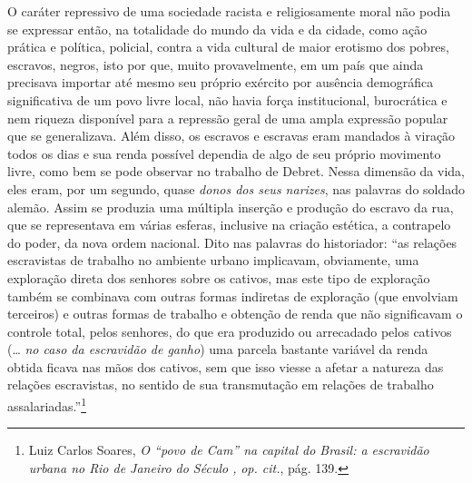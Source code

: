 O caráter repressivo de uma sociedade racista e religiosamente moral não
podia se expressar então, na totalidade do mundo da vida e da cidade,
como ação prática e política, policial, contra a vida cultural de maior
erotismo dos pobres, escravos, negros, isto por que, muito
provavelmente, em um país que ainda precisava importar até mesmo seu
próprio exército por ausência demográfica significativa de um povo livre
local, não havia força institucional, burocrática e nem riqueza
disponível para a repressão geral de uma ampla expressão popular que se
generalizava. Além disso, os escravos e escravas eram mandados à viração
todos os dias e sua renda possível dependia de algo de seu próprio
movimento livre, como bem se pode observar no trabalho de Debret. Nessa
dimensão da vida, eles eram, por um segundo, quase \emph{donos dos seus
narizes}, nas palavras do soldado alemão. Assim se produzia uma múltipla
inserção e produção do escravo da rua, que se representava em várias
esferas, inclusive na criação estética, a contrapelo do poder, da nova
ordem nacional. Dito nas palavras do historiador: ``as relações
escravistas de trabalho no ambiente urbano implicavam, obviamente, uma
exploração direta dos senhores sobre os cativos, mas este tipo de
exploração também se combinava com outras formas indiretas de exploração
(que envolviam terceiros) e outras formas de trabalho e obtenção de
renda que não significavam o controle total, pelos senhores, do que era
produzido ou arrecadado pelos cativos (\ldots{} \emph{no caso da escravidão
de ganho}) uma parcela bastante variável da renda obtida ficava nas mãos
dos cativos, sem que isso viesse a afetar a natureza das relações
escravistas, no sentido de sua transmutação em relações de trabalho
assalariadas.''\footnote{Luiz Carlos Soares, \emph{O ``povo de Cam'' na
  capital do Brasil: a escravidão urbana no Rio de Janeiro do Século
  ,} \emph{op. cit.}, pág. 139.}

